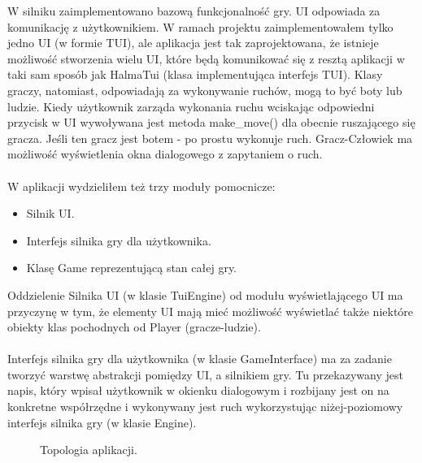 \documentclass[12pt, titlepage]{article}
\begin{document}
\noindent
W silniku zaimplementowano bazową funkcjonalność gry.
UI odpowiada za komunikację z użytkownikiem. W ramach
projektu zaimplementowałem tylko jedno UI (w formie TUI),
ale aplikacja
jest tak zaprojektowana, że istnieje możliwość stworzenia
wielu UI, które będą komunikować się z resztą aplikacji
w taki sam sposób jak HalmaTui (klasa implementująca interfejs TUI).
Klasy graczy, natomiast, odpowiadają za wykonywanie ruchów,
mogą to być boty lub ludzie. Kiedy użytkownik zarząda wykonania
ruchu wciskając odpowiedni przycisk w UI wywoływana jest metoda
make\_move() dla obecnie ruszającego się gracza. Jeśli ten gracz
jest botem - po prostu wykonuje ruch. Gracz-Człowiek ma możliwość
wyświetlenia okna dialogowego z zapytaniem o ruch.
\\~\\
W aplikacji wydzieliłem też trzy moduły pomocnicze:
\begin{itemize}
\item Silnik UI.
\item Interfejs silnika gry dla użytkownika.
\item Klasę Game reprezentującą stan całej gry.
\end{itemize}

\noindent
Oddzielenie Silnika UI (w klasie TuiEngine) od
modułu wyświetlającego UI ma przyczynę w tym, że
elementy UI mają mieć możliwość wyświetlać także
niektóre obiekty klas pochodnych od Player (gracze-ludzie).
\\~\\
Interfejs silnika gry dla użytkownika (w klasie GameInterface)
ma za zadanie tworzyć warstwę abstrakcji pomiędzy UI, a silnikiem
gry. Tu przekazywany jest napis, który wpisał użytkownik w okienku
dialogowym i rozbijany jest on na konkretne współrzędne i
wykonywany jest ruch wykorzystując niżej-poziomowy interfejs
silnika gry (w klasie Engine).

\begin{figure}[H]
	\centering
	
	\caption{Topologia aplikacji.}
	\label{fig:topos}
\end{figure}
\end{document}
